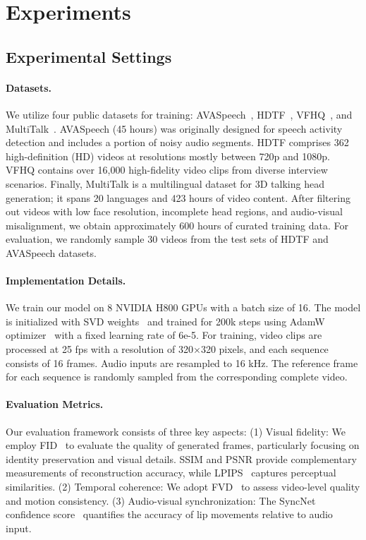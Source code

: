 \section{Experiments}
\subsection{Experimental Settings}

\paragraph{Datasets.}
We utilize four public datasets for training: AVASpeech~\citep{chaudhuri2018ava}, HDTF~\citep{zhang2021flow}, VFHQ~\citep{wang2022vfhq}, and MultiTalk~\citep{sung2024multitalk}. AVASpeech (45 hours) was originally designed for speech activity detection and includes a portion of noisy audio segments. HDTF comprises 362 high-definition (HD) videos at resolutions mostly between 720p and 1080p. VFHQ contains over 16,000 high-fidelity video clips from diverse interview scenarios. Finally, MultiTalk is a multilingual dataset for 3D talking head generation; it spans 20 languages and 423 hours of video content. After filtering out videos with low face resolution, incomplete head regions, and audio-visual misalignment, we obtain approximately 600 hours of curated training data. For evaluation, we randomly sample 30 videos from the test sets of HDTF and AVASpeech datasets.

\paragraph{Implementation Details.}
We train our model on 8 NVIDIA H800 GPUs with a batch size of 16. The model is initialized with SVD weights~\citep{blattmann2023stable} and trained for 200k steps using AdamW optimizer~\citep{loshchilov2017decoupled} with a fixed learning rate of 6e-5. For training, video clips are processed at 25 fps with a resolution of 320×320 pixels, and each sequence consists of 16 frames. Audio inputs are resampled to 16 kHz. The reference frame for each sequence is randomly sampled from the corresponding complete video.

\paragraph{Evaluation Metrics.}
Our evaluation framework consists of three key aspects: (1) Visual fidelity: We employ FID~\citep{heusel2017gans} to evaluate the quality of generated frames, particularly focusing on identity preservation and visual details. SSIM and PSNR provide complementary measurements of reconstruction accuracy, while LPIPS~\citep{zhang2018unreasonable} captures perceptual similarities. (2) Temporal coherence: We adopt FVD~\citep{unterthiner2018towards} to assess video-level quality and motion consistency. (3) Audio-visual synchronization: The SyncNet confidence score~\citep{chung2017out} quantifies the accuracy of lip movements relative to audio input.



